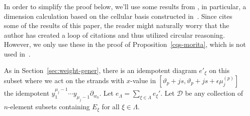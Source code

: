 In order to simplify the proof below, we'll use some results from
\cite{WebRou}, in particular, a dimension calculation based on the
cellular basis constructed in~\cite[Thm.~2.26]{WebRou}. Since
\cite{WebRou} cites some of the results of this paper, the reader
might naturally worry that the author has created a loop of citations
and thus utilized circular reasoning. However, we only use these in the
proof of Proposition~\ref{cqs-morita}, which is not used in~\cite{WebRou}.




As in
Section~\ref{sec:weight-gener}, there is an idempotent diagram
$e'_\xi$ on this
subset where we act on the strands with $x$-value in $[
\vartheta_p+js,\vartheta_p+js+\epsilon\mu^{(p)}_j]$ the idempotent 
$y^{\mu_j-1}_1\cdots y_{\mu_j-1}\partial_{w_0}$. Let
$e_\Lambda=\sum_{\xi\in \Lambda} e_\xi'$. Let $\mathscr{D}$ be any
collection of $n$-element subsets containing $E_\xi$ for all $\xi\in \Lambda$.

